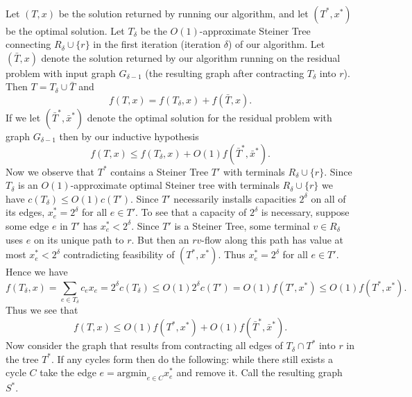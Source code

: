 \documentclass[letterpaper,12pt,oneside,onecolumn]{article}
\begin{document}
\paragraph{}
Let $(T,x)$ be the solution returned by running our algorithm, and let $(T^*, x^*)$ be the optimal solution. Let $T_{\delta}$ be the $O(1)$-approximate Steiner Tree connecting $R_\delta \cup \{r\}$ in the first iteration (iteration $\delta$) of our algorithm. Let $(\bar{T}, x)$ denote the solution returned by our algorithm running on the residual problem with input graph $G_{\delta-1}$ (the resulting graph after contracting $T_{\delta}$ into $r$). Then $T = T_\delta \cup \bar{T}$ and 
$$f(T,x) = f(T_\delta, x) + f(\bar{T},x).$$
If we let $(\bar{T}^*, \bar{x}^*)$ denote the optimal solution for the residual problem with graph $G_{\delta - 1}$ then by our inductive hypothesis
$$f(T,x) \leq f(T_\delta,x) + O(1)f(\bar{T}^*, \bar{x}^*).$$
Now we observe that $T^*$ contains a Steiner Tree $T'$ with terminals $R_\delta \cup \{r\}$. Since $T_\delta$ is an $O(1)$-approximate optimal Steiner tree with terminals $R_\delta \cup \{r\}$ we have $c(T_\delta) \leq O(1) c(T')$. Since $T'$ necessarily installs capacities $2^\delta$ on all of its edges, $x_e^* = 2^\delta$ for all $e \in T'$. To see that a capacity of $2^\delta$ is necessary, suppose some edge $e$ in $T'$ has $x^*_e < 2^\delta$. Since $T'$ is a Steiner Tree, some terminal $v \in R_\delta$ uses $e$ on its unique path to $r$. But then an $rv$-flow along this path has value at most $x^*_e < 2^\delta$ contradicting feasibility of $(T^*, x^*)$. Thus $x_e^* = 2^\delta$ for all $e \in T'$. Hence we have
$$f(T_\delta, x) = \sum_{e \in T_\delta} c_e x_e = 2^\delta c(T_\delta) \leq O(1)2^\delta c(T') = O(1)f(T', x^*) \leq O(1) f(T^*, x^*).$$
Thus we see that
$$f(T,x) \leq O(1) f(T^*,x^*) + O(1) f(\bar{T}^*, \bar{x}^*).$$
Now consider the graph that results from contracting all edges of $T_\delta \cap T^*$ into $r$ in the tree $T^*$. If any cycles form then do the following: while there still exists a cycle $C$ take the edge $e = \text{argmin}_{e\in C} x^*_e$ and remove it. Call the resulting graph $S^*$. 
\end{document}
